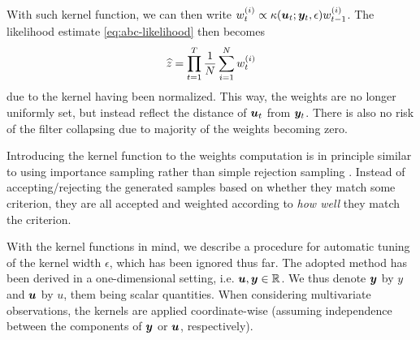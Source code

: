 With such kernel function, we can then write $w_t^{(i)} \propto \kappa(\bm{u}_t; \bm{y}_t, \epsilon) w_{t-1}^{(i)}$. The likelihood estimate \eqref{eq:abc-likelihood} then becomes
\begin{equation} \label{eq:abc-likelihood-kernel}
\widehat{z} = \prod_{t=1}^T \frac{1}{N} \sum_{i=1}^N w_t^{(i)}
\end{equation}
due to the kernel having been normalized. This way, the weights are no longer uniformly set, but instead reflect the distance of $\bm{u}_t$ from $\bm{y}_t$. There is also no risk of the filter collapsing due to majority of the weights becoming zero.

Introducing the kernel function to the weights computation is in principle similar to using importance sampling rather than simple rejection sampling \citep{information-theory}. Instead of accepting/rejecting the generated samples based on whether they match some criterion, they are all accepted and weighted according to \emph{how well} they match the criterion.

With the kernel functions in mind, we describe a procedure for automatic tuning of the kernel width $\epsilon$, which has been ignored thus far. The adopted method has been derived in a one-dimensional setting, i.e. $\bm{u}, \bm{y} \in \mathbb{R}$. We thus denote $\bm{y}$ by $y$ and $\bm{u}$ by $u$, them being scalar quantities. When considering multivariate observations, the kernels are applied coordinate-wise (assuming independence between the components of $\bm{y}$ or $\bm{u}$, respectively).

